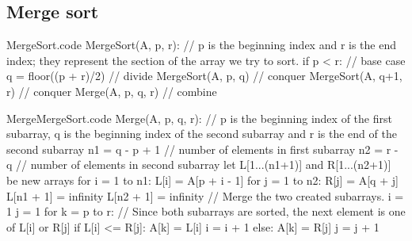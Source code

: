 \documentclass[a4paper]{article}
\begin{document}
\subsection{Merge sort}

\begin{filecontents*}[overwrite]{MergeSort.code}
MergeSort(A, p, r):
    // p is the beginning index and r is the end index; they represent the section of the array we try to sort.
    if p < r:  // base case
        q = floor((p + r)/2)  // divide
        MergeSort(A, p, q)  // conquer
        MergeSort(A, q+1, r)  // conquer
        Merge(A, p, q, r)  // combine
\end{filecontents*}

\begin{filecontents*}[overwrite]{MergeMergeSort.code}
Merge(A, p, q, r):
    // p is the beginning index of the first subarray, q is the beginning index of the second subarray and r is the end of the second subarray
    n1 = q - p + 1 // number of elements in first subarray
    n2 = r - q  // number of elements in second subarray
    let L[1...(n1+1)] and R[1...(n2+1)] be new arrays
    for i = 1 to n1:
        L[i] = A[p + i - 1]
    for j = 1 to n2:
        R[j] = A[q + j]
    L[n1 + 1] = infinity
    L[n2 + 1] = infinity
    // Merge the two created subarrays.
    i = 1
    j = 1
    for k = p to r:
        // Since both subarrays are sorted, the next element is one of L[i] or R[j]
        if L[i] <= R[j]:
            A[k] = L[i]
            i = i + 1
        else:
            A[k] = R[j]
            j = j + 1
\end{filecontents*}
\end{document}

